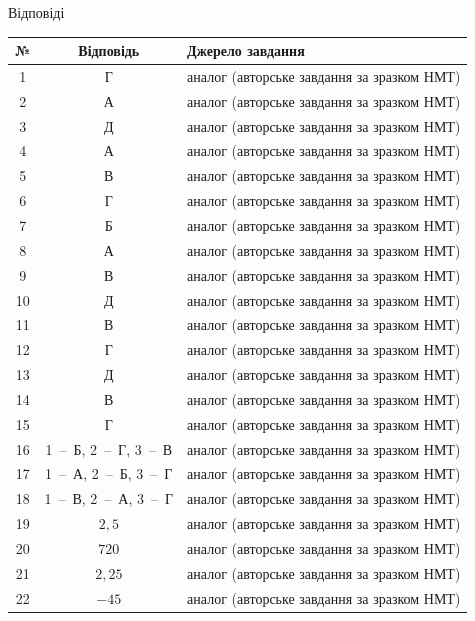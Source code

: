 \documentclass[12pt]{article}
\newcommand{\sectionTitle}[1]{%
\par\vspace{0.4cm}
\begin{tcolorbox}[colback=titleBg, colframe=titleBg, boxrule=0pt, arc=8pt,
    halign=center, fontupper=\Large\bfseries\color{mainGreen}]
\hyphenpenalty=10000 \exhyphenpenalty=10000 #1
\end{tcolorbox}
\par\vspace{0.3cm}
}
\begin{document}
\clearpage
\sectionTitle{Відповіді}

\begin{center}\small\renewcommand{\arraystretch}{1.25}
\begin{tabular}{|c|c|p{}|}\hline
\textbf{№} & \textbf{Відповідь} & \textbf{Джерело завдання} \\ \hline
1 & Г & аналог (авторське завдання за зразком НМТ) \\ \hline
2 & А & аналог (авторське завдання за зразком НМТ) \\ \hline
3 & Д & аналог (авторське завдання за зразком НМТ) \\ \hline
4 & А & аналог (авторське завдання за зразком НМТ) \\ \hline
5 & В & аналог (авторське завдання за зразком НМТ) \\ \hline
6 & Г & аналог (авторське завдання за зразком НМТ) \\ \hline
7 & Б & аналог (авторське завдання за зразком НМТ) \\ \hline
8 & А & аналог (авторське завдання за зразком НМТ) \\ \hline
9 & В & аналог (авторське завдання за зразком НМТ) \\ \hline
10 & Д & аналог (авторське завдання за зразком НМТ) \\ \hline
11 & В & аналог (авторське завдання за зразком НМТ) \\ \hline
12 & Г & аналог (авторське завдання за зразком НМТ) \\ \hline
13 & Д & аналог (авторське завдання за зразком НМТ) \\ \hline
14 & В & аналог (авторське завдання за зразком НМТ) \\ \hline
15 & Г & аналог (авторське завдання за зразком НМТ) \\ \hline
16 & 1~--~Б, 2~--~Г, 3~--~В & аналог (авторське завдання за зразком НМТ) \\ \hline
17 & 1~--~А, 2~--~Б, 3~--~Г & аналог (авторське завдання за зразком НМТ) \\ \hline
18 & 1~--~В, 2~--~А, 3~--~Г & аналог (авторське завдання за зразком НМТ) \\ \hline
19 & $2{,}5$ & аналог (авторське завдання за зразком НМТ) \\ \hline
20 & $720$ & аналог (авторське завдання за зразком НМТ) \\ \hline
21 & $2{,}25$ & аналог (авторське завдання за зразком НМТ) \\ \hline
22 & $-45$ & аналог (авторське завдання за зразком НМТ) \\ \hline
\end{tabular}\end{center}

\end{document}
